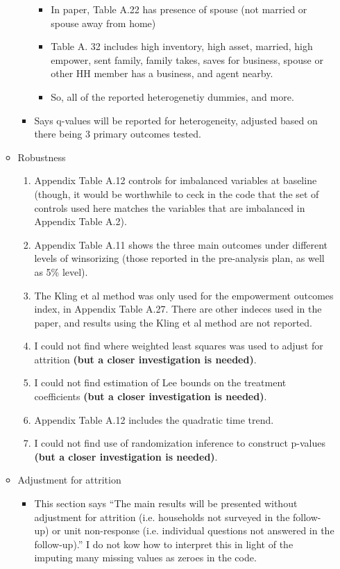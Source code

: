 \documentclass[]{article}
\begin{document}
\begin{itemize}
\begin{itemize}
\begin{itemize}
		\begin{itemize}
			\item In paper, Table A.22 has presence of spouse (not married or spouse away from home)
			\item Table A. 32 includes high inventory,  high asset, married, high empower, sent family, family takes, saves for business, spouse or other HH member has a business, and agent nearby. 
			\item So, all of the reported heterogenetiy dummies, and more.
		\end{itemize}
		\item Says q-values will be reported for heterogeneity, adjusted based on there being 3 primary outcomes tested.
	\end{itemize}
	\item Robustness
	\begin{enumerate}
		\item Appendix Table A.12 controls for imbalanced variables at baseline (though, it would be worthwhile to ceck in the code that the set of controls used here matches the variables that are imbalanced in Appendix Table A.2).
		\item Appendix Table A.11 shows the three main outcomes under different levels of winsorizing (those reported in the pre-analysis plan, as well as 5\% level).
		\item The Kling et al method was only used for the empowerment outcomes index, in Appendix Table A.27. There are other indeces used in the paper, and results using the Kling et al method are not reported.
		\item I could not find where weighted least squares was used to adjust for attrition \textbf{(but a closer investigation is needed)}.
		\item I could not find estimation of Lee bounds on the treatment coefficients \textbf{(but a closer investigation is needed)}.
		\item Appendix Table A.12 includes the quadratic time trend.
		\item I could not find use of randomization inference to construct p-values \textbf{(but a closer investigation is needed)}.
	\end{enumerate}
	\item Adjustment for attrition
	\begin{itemize}
		\item This section says ``The main results will be presented without adjustment for attrition (i.e. households not surveyed in the follow-up) or unit non-response (i.e. individual questions not answered in the follow-up).'' I do not kow how to interpret this in light of the imputing many missing values as zeroes in the code.

\end{itemize}
\end{itemize}
\end{itemize}
\end{document}
